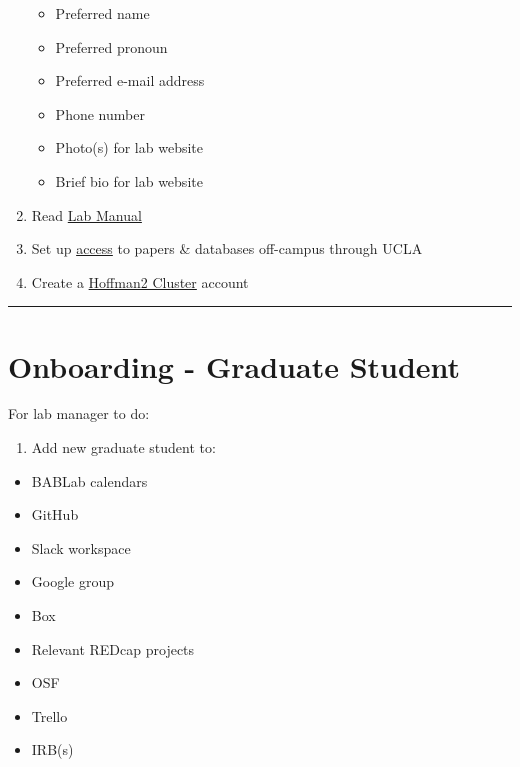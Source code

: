 \documentclass[]{book}
\providecommand{\tightlist}{%
  \setlength{\itemsep}{0pt}\setlength{\parskip}{0pt}}
\begin{document}
\begin{enumerate}
  \begin{itemize}
  \tightlist
  \item
    Preferred name
  \item
    Preferred pronoun
  \item
    Preferred e-mail address
  \item
    Phone number
  \item
    Photo(s) for lab website
  \item
    Brief bio for lab website
  \end{itemize}
\item
  Read \href{https://bablab.github.io/lab_manual/}{Lab Manual}
\item
  Set up \href{https://www.library.ucla.edu/use/computers-computing-services/connect-campus}{access} to papers \& databases off-campus through UCLA
\item
  Create a \href{https://www.hoffman2.idre.ucla.edu/}{Hoffman2 Cluster} account
\end{enumerate}

\begin{center}\rule{0.5\linewidth}{0.5pt}\end{center}

\hypertarget{onboarding---graduate-student}{%
\section{Onboarding - Graduate Student}\label{onboarding---graduate-student}}

For lab manager to do:

\begin{enumerate}
\def\labelenumi{\arabic{enumi}.}
\tightlist
\item
  Add new graduate student to:
\end{enumerate}

\begin{itemize}
\tightlist
\item
  BABLab calendars
\item
  GitHub
\item
  Slack workspace
\item
  Google group
\item
  Box
\item
  Relevant REDcap projects
\item
  OSF
\item
  Trello
\item
  IRB(s)
\end{itemize}
\end{document}
